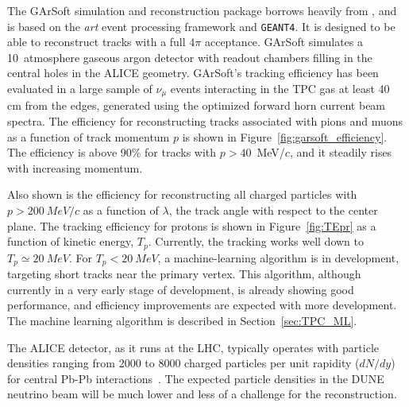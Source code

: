 The GArSoft simulation and reconstruction package borrows heavily from  , and is based on the {\it art} event processing framework and {\tt GEANT4}.  It is designed to be able to reconstruct tracks with a full $4\pi$ acceptance.   GArSoft simulates a 10~atmosphere gaseous argon detector with readout chambers filling in the central holes in the ALICE geometry.  GArSoft's tracking efficiency has been evaluated in a large sample of  $\nu_\mu$ events interacting in the TPC gas at least 40 cm from the edges, generated using the optimized  forward horn current beam spectra. The efficiency
for reconstructing tracks associated with pions and muons as a function of track momentum $p$ is shown in  Figure~\ref{fig:garsoft_efficiency}.  The efficiency is above 90\% for tracks with $p>40$~MeV/$c$, and it steadily rises with increasing momentum.  

Also shown is the efficiency for reconstructing all charged particles with $p>\SI{200}{MeV/c}$ as a function of $\lambda$,  the track angle with respect to the center plane.  The tracking efficiency for protons is shown in Figure~\ref{fig:TEpr} as a function of kinetic energy, $T_p$.  Currently, the tracking works well down to $T_p \simeq \SI{20}{MeV}$. For $T_p < \SI{20}{MeV}$, a machine-learning algorithm is in development, targeting short tracks near the primary vertex. This algorithm, although currently in a very early stage of development, is already showing good performance, and efficiency improvements are expected with more development. The machine learning algorithm is described in Section~\ref{sec:TPC_ML}.

The ALICE detector, as it runs at the LHC, typically operates with particle densities ranging from 2000 to 8000 charged particles per unit rapidity ($dN/dy$) for central Pb-Pb interactions~\cite{Cheshkov:2006ym}. The expected particle densities in the DUNE neutrino beam will be much lower and less of a challenge for the reconstruction. 


